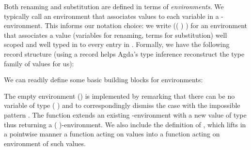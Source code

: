 Both renaming and substitution are defined in terms of \emph{environments}.
We typically call an environment that associates values
to each variable in  a -environment. This informs our notation choice: we write
{(( )  )} for an environment that associates
a value  (variables for renaming, terms for substitution) well scoped
and well typed in  to every entry in . Formally, we have the following
record structure (using a record helps Agda's type inference reconstruct the
type family  of values for us):

\begin{center}
\end{center}


We can readily define some basic building blocks for environments:
\begin{center}
\begin{minipage}[t]{0.3\textwidth}
\end{minipage}\begin{minipage}[t]{0.6\textwidth}
\end{minipage}
\end{center}
The empty environment () is implemented
by remarking that there can be no variable of type
{(  \AIC{[]})} and to correspondingly dismiss the case with
the impossible pattern \AS{()}. The function  extends an existing
-environment with a new value of type  thus returning a
{(  )}-environment. We also include the definition
of \AF{\_<\$>\_}, which lifts in a pointwise manner a function acting
on values into a function acting on environment of such values.


